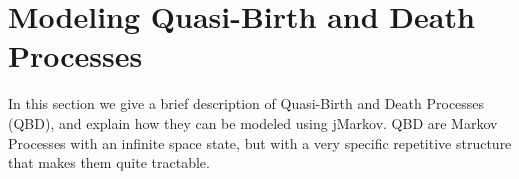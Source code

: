\documentclass[11pt,letterpaper]{article}
\begin{document}










\section{Modeling Quasi-Birth and Death Processes}\label{sec:QBD}

In this section we give a brief description of Quasi-Birth and Death Processes (QBD), and explain how they can be modeled using jMarkov. QBD are Markov Processes with an infinite space state, but with a very specific repetitive structure that makes them quite tractable.
\end{document}
